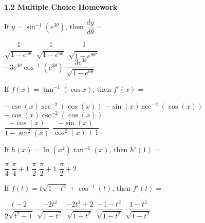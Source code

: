 \documentclass[11pt]{exam}
\newcommand{\horizontalline}{\noindent\makebox[\linewidth]{\rule{\textwidth}{1pt}}}
\begin{document}
\textbf{\large{1.2 Multiple Choice Homework}} \par

\begin{questions}
    \question If $y = \sin^{-1} \left(e^{3\theta}\right)$, then $\dfrac{dy}{d\theta} = $ \\

    \begin{oneparchoices}
        \choice $\dfrac{1}{\sqrt{1 - e^{3\theta}}}$
        \choice $\dfrac{1}{\sqrt{1 - e^{6\theta}}}$
        \choice $\dfrac{1}{\sqrt{1 - e^{9\theta^2}}}$ \\[11pt]
        \makebox[0.2 \textwidth] \choice $-3e^{3\theta}\cos^{-1} \left(e^{3\theta}\right)$ 
        \makebox[0.25 \textwidth] \choice $\dfrac{3e^{3\theta}}{\sqrt{1 - e^{6\theta}}}$
    \end{oneparchoices} \par \horizontalline

    \question If $f(x) = \tan^{-1}(\cos x)$, then $f'(x) = $ \\

    \begin{oneparchoices}
        \choice $-\csc (x)\sec^{-2} (\cos (x))$
        \choice $-\sin (x)\sec^{-2} (\cos (x))$
        \choice $-\cos (x)\csc^{-2} (\cos (x))$ \\[11pt] 
        \makebox[0.23 \textwidth] \choice $\dfrac{-\cos (x)}{1 - \sin^2(x)}$
        \makebox[0.25 \textwidth] \choice $\dfrac{-\sin (x)}{\cos^2 (x) + 1}$
    \end{oneparchoices} \par \horizontalline

    \question If $h(x) = \ln \left(x^2\right)\tan^{-1} (x)$, then $h'(1) = $ \\

    \begin{oneparchoices}
        \choice $\dfrac{\pi}{4}$
        \choice $\dfrac{\pi}{4} + 1$
        \choice $\dfrac{\pi}{2}$
        \choice $\dfrac{\pi}{2} + 1$
        \choice $\dfrac{\pi}{2} + 2$
    \end{oneparchoices} \par \horizontalline

    \question If $f(t) = t\sqrt{1 - t^2} + \cos^{-1} (t)$, then $f'(t) = $ \\

    \begin{oneparchoices}
        \choice $\dfrac{t - 2}{2\sqrt{t^2 - 1}}$
        \choice $\dfrac{-2t^2}{\sqrt{1 - t^2}}$
        \choice $\dfrac{-2t^2 + 2}{\sqrt{1 - t^2}}$
        \choice $\dfrac{-1 - t^2}{\sqrt{1 - t^2}}$
        \choice $\dfrac{1 - t^2}{\sqrt{1 - t^2}}$
    \end{oneparchoices} \par \horizontalline


\end{questions}
\end{document}
